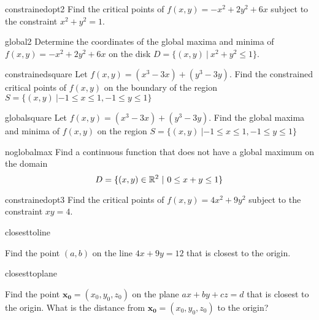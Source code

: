\begin{problem}{constrainedopt2}
    Find the critical points of $f(x,y) = -x^2+2y^2+6x$ subject to the constraint $x^2+y^2=1$.  
\end{problem}

\begin{problem}{global2}
    Determine the coordinates of the global maxima and minima of $f(x,y) = -x^2+2y^2+6x$ on the disk $D = \{ (x,y) \ | \ x^2 + y^2 \leq 1\}$.
\end{problem}

\begin{problem}{constrainedsquare}
    Let $f(x,y) = (x^3 - 3x) + (y^3-3y)$.  Find the constrained critical points of $f(x,y)$ on the boundary of the region $S = \{(x,y) \ | -1 \leq x \leq 1, -1 \leq y \leq 1\}$
\end{problem}

\begin{problem}{globalsquare}
    Let $f(x,y) = (x^3 - 3x) + (y^3-3y)$.  Find the global maxima and minima of $f(x,y)$ on the region $S = \{(x,y) \ | -1 \leq x \leq 1, -1 \leq y \leq 1\}$
\end{problem}

\begin{problem}{noglobalmax}
    Find a continuous function that does not have a global maximum on the domain $$D = \{(x,y) \in \mathbb{R}^2 \ | \ 0 \leq x + y \leq 1 \}$$
\end{problem}


\begin{problem}{constrainedopt3}
    Find the critical points of $f(x,y) = 4x^2+9y^2$ subject to the constraint $xy=4$.  
\end{problem}

\begin{problem}{closesttoline}

Find the point $(a,b)$ on the line $4x+9y=12$ that is closest to the origin.
   
\end{problem}

\begin{problem}{closesttoplane}

Find the point $\bm{x_0}=(x_0,y_0,z_0)$ on the plane $ax + by + cz = d$ that is closest to the origin.  What is the distance from $\bm{x_0}=(x_0,y_0,z_0)$ to the origin?
   
\end{problem}